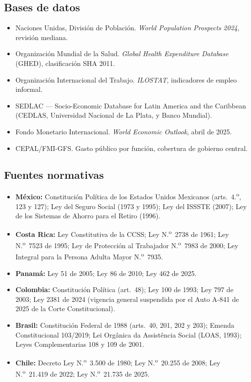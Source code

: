 \documentclass[12pt, letterpaper]{article}
\begin{document}
\subsection*{Bases de datos}

\begin{itemize}
  \item Naciones Unidas, División de Población. \textit{World Population
        Prospects 2024}, revisión mediana.
  \item Organización Mundial de la Salud. \textit{Global Health Expenditure
        Database} (GHED), clasificación SHA 2011.
  \item Organización Internacional del Trabajo. \textit{ILOSTAT}, indicadores de
        empleo informal.
  \item SEDLAC --- Socio-Economic Database for Latin America and the Caribbean
        (CEDLAS, Universidad Nacional de La Plata, y Banco Mundial).
  \item Fondo Monetario Internacional. \textit{World Economic Outlook}, abril de
        2025.
  \item CEPAL/FMI-GFS. Gasto público por función, cobertura de gobierno central.
\end{itemize}

\subsection*{Fuentes normativas}

\begin{itemize}
  \item \textbf{México:} Constitución Política de los Estados Unidos Mexicanos
        (arts.\ 4.\textsuperscript{o}, 123 y 127); Ley del Seguro Social (1973 y
        1995); Ley del ISSSTE (2007); Ley de los Sistemas de Ahorro para el
        Retiro (1996).
  \item \textbf{Costa Rica:} Ley Constitutiva de la CCSS;
        Ley N.\textsuperscript{o}~2738 de 1961; Ley N.\textsuperscript{o}~7523 de
        1995; Ley de Protección al Trabajador N.\textsuperscript{o}~7983 de 2000;
        Ley Integral para la Persona Adulta Mayor N.\textsuperscript{o}~7935.
  \item \textbf{Panamá:} Ley 51 de 2005; Ley 86 de 2010; Ley 462 de 2025.
  \item \textbf{Colombia:} Constitución Política (art.\ 48); Ley 100 de 1993;
        Ley 797 de 2003; Ley 2381 de 2024 (vigencia general suspendida por el
        Auto A-841 de 2025 de la Corte Constitucional).
  \item \textbf{Brasil:} Constitución Federal de 1988 (arts.\ 40, 201, 202 y
        203); Emenda Constitucional 103/2019; Lei Orgânica da Assistência Social
        (LOAS, 1993); Leyes Complementarias 108 y 109 de 2001.
  \item \textbf{Chile:} Decreto Ley N.\textsuperscript{o}~3.500 de 1980;
        Ley N.\textsuperscript{o}~20.255 de 2008;
        Ley N.\textsuperscript{o}~21.419 de 2022;
        Ley N.\textsuperscript{o}~21.735 de 2025.
\end{itemize}
\end{document}
